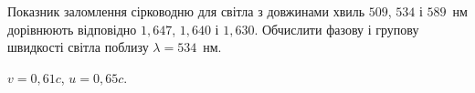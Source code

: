 \begin{problem}%
Показник заломлення сірководню для світла з довжинами хвиль $509$,
$534$ і $589$~нм дорівнюють відповідно $1,647$, $1,640$ і $1,630$. Обчислити
фазову і групову швидкості світла поблизу $\lambda=534$~нм.
\begin{solution}
	$v = 0,61c$, $u = 0,65c$.
\end{solution}
\end{problem}
















